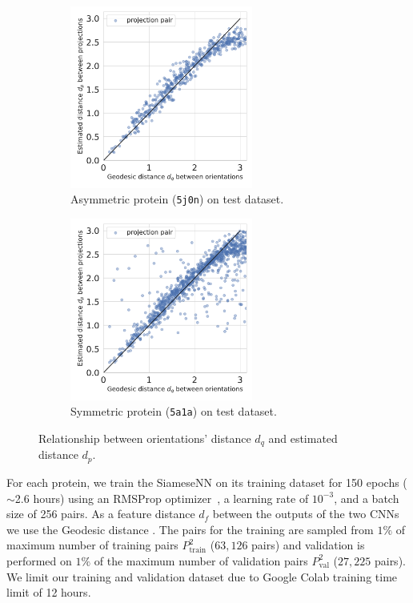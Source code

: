 \begin{figure}
    \centering
    \begin{subfigure}[b]{0.5\columnwidth}
        \includegraphics[height=6cm]{figures/dPdQ_5j0n}
        \caption{Asymmetric protein (\texttt{5j0n}) on test dataset.}
    \end{subfigure}
    \begin{subfigure}[b]{0.45\columnwidth}
    \centering
        \includegraphics[height=6cm]{figures/dPdQ_5a1a}
        \caption{Symmetric protein (\texttt{5a1a}) on test dataset.}
    \end{subfigure}
    \caption{Relationship between orientations' distance $d_q$ and estimated distance $d_p$.}
    \label{fig:learned-distance-siamese}
\end{figure}

For each protein, we train the SiameseNN on its training dataset for 150 epochs ($\sim$2.6 hours) using an RMSProp optimizer~\cite{noauthor_tfkerasoptimizersrmsprop_nodate}, a learning rate of $10^{-3}$, and a batch size of 256 pairs. As a feature distance $d_f$ between the outputs of the two CNNs we use the Geodesic distance .
The pairs for the training are sampled from $1\%$ of maximum number of training pairs $P_{\text{train}}^2$ ($63,126$ pairs) and validation is performed on $1\%$ of the maximum number of validation pairs $P_{\text{val}}^2$ ($27,225$ pairs). We limit our training and validation dataset due to Google Colab training time limit of 12 hours.

